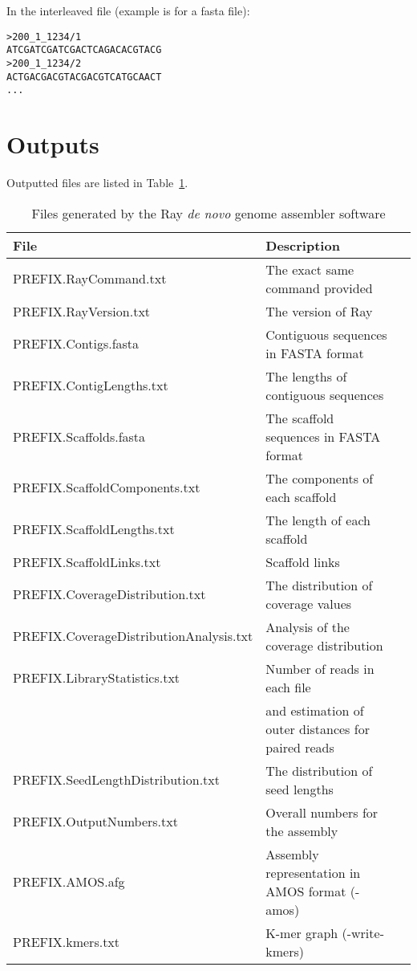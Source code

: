 \documentclass{article}
\begin{document}
In the interleaved file (example is for a fasta file):

\begin{verbatim}
>200_1_1234/1
ATCGATCGATCGACTCAGACACGTACG
>200_1_1234/2
ACTGACGACGTACGACGTCATGCAACT
...
\end{verbatim}



\section{Outputs}

Outputted files are listed in Table~\ref{outputs}.

\begin{table}[h]
\caption{Files generated by the Ray \emph{de novo} genome assembler software}\label{outputs}
\begin{tabular}{lll}
\hline
File& Description\\
\hline
PREFIX.RayCommand.txt & The exact same command provided \\
PREFIX.RayVersion.txt & The version of Ray\\
PREFIX.Contigs.fasta & Contiguous sequences in FASTA format\\
PREFIX.ContigLengths.txt & The lengths of contiguous sequences\\
PREFIX.Scaffolds.fasta & The scaffold sequences in FASTA format \\
PREFIX.ScaffoldComponents.txt & The components of each scaffold\\
PREFIX.ScaffoldLengths.txt & The length of each scaffold \\
PREFIX.ScaffoldLinks.txt & Scaffold links \\
PREFIX.CoverageDistribution.txt & The distribution of coverage values \\
PREFIX.CoverageDistributionAnalysis.txt & Analysis of the coverage distribution \\
PREFIX.LibraryStatistics.txt & Number of reads in each file \\
 & and estimation of outer distances for paired reads \\
PREFIX.SeedLengthDistribution.txt & The distribution of seed lengths \\
PREFIX.OutputNumbers.txt & Overall numbers for the assembly\\
PREFIX.AMOS.afg & Assembly representation in AMOS format (-amos) \\
PREFIX.kmers.txt & K-mer graph (-write-kmers) \\
\hline
\end{tabular}
\end{table}
\end{document}
